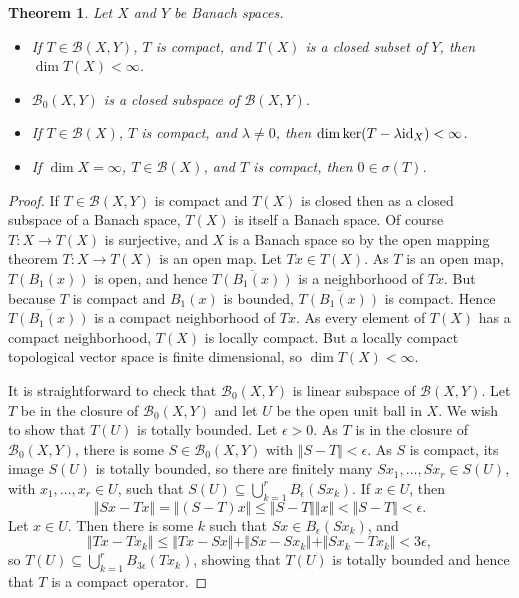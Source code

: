 \documentclass{article}
\newcommand{\id}{\ensuremath\mathrm{id}}
\newcommand{\norm}[1]{\Vert #1 \Vert}
\newtheorem{theorem}{Theorem}
\begin{document}
\begin{theorem}
Let $X$ and $Y$ be Banach spaces.
\begin{itemize}
\item If $T \in \mathscr{B}(X,Y)$, $T$ is compact, and $T(X)$ is a closed subset of $Y$, then $\dim T(X)<\infty$.
\item $\mathscr{B}_0(X,Y)$ is a closed subspace of $\mathscr{B}(X,Y)$.
\item If $T \in \mathscr{B}(X)$, $T$ is compact, and $\lambda \neq 0$, then $\dim \ker(T-\lambda \id_X) < \infty$.
\item If $\dim X=\infty$, $T \in \mathscr{B}(X)$, and $T$ is compact, then $0 \in \sigma(T)$.
\end{itemize}
\label{bigtheorem}
\end{theorem}
\begin{proof}
If $T \in \mathscr{B}(X,Y)$ is compact and $T(X)$ is closed then as a closed subspace of a Banach space, $T(X)$ is itself a Banach space. 
Of course $T:X \to T(X)$ is surjective, and $X$ is a Banach space so by the open mapping theorem $T:X \to T(X)$ is an open map.
Let $Tx \in T(X)$. As $T$ is an open map, $T(B_1(x))$ is open, and hence $\overline{T(B_1(x))}$ is a  neighborhood
of $Tx$. But because $T$ is compact and $B_1(x)$ is bounded, $\overline{T(B_1(x))}$ is compact. Hence $\overline{T(B_1(x))}$ is a compact
neighborhood of $Tx$. As every element of $T(X)$ has a compact neighborhood, $T(X)$ is locally compact.
But a locally compact topological vector space is finite dimensional, so $\dim T(X) < \infty$.


It is straightforward to check that $\mathscr{B}_0(X,Y)$ is linear subspace of $\mathscr{B}(X,Y)$. 
Let $T$ be in the closure of $\mathscr{B}_0(X,Y)$ and let $U$ be the open unit ball in $X$. We wish to show that $T(U)$ is totally bounded.
Let $\epsilon>0$. As $T$ is in the closure of $\mathscr{B}_0(X,Y)$, there is some $S \in \mathscr{B}_0(X,Y)$ with $\norm{S-T} < \epsilon$. As $S$ is compact, its image
$S(U)$ is totally bounded, so there are finitely many $Sx_1,\ldots,Sx_r \in S(U)$, with $x_1,\ldots,x_r \in U$, such that $S(U) \subseteq \bigcup_{k=1}^r B_\epsilon(Sx_k)$.
If $x \in U$, then
\[
\norm{Sx-Tx}=\norm{(S-T)x} \leq \norm{S-T} \norm{x} < \norm{S-T}<\epsilon.
\]
Let $x \in U$. Then there is some $k$ such that $Sx \in B_\epsilon(Sx_k)$, and
\[
\norm{Tx-Tx_k} \leq \norm{Tx-Sx} + \norm{Sx-Sx_k}+\norm{Sx_k-Tx_k}<3\epsilon,
\]
so $T(U) \subseteq \bigcup_{k=1}^r B_{3\epsilon}(Tx_k)$, showing that $T(U)$ is totally bounded and hence that $T$ is a compact operator.


\end{proof}
\end{document}
